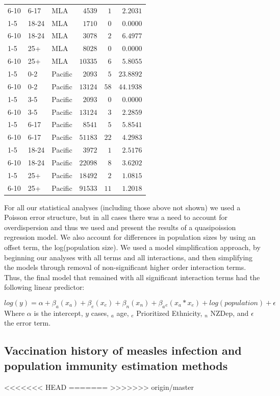 \documentclass{article}
\begin{document}
\begin{itemize}
\begin{table}[hbtp]
\begin{center}
\begin{tabular}{lllrrr}
6-10&6-17&MLA&$   4539$&$  1$&$ 2.2031$\tabularnewline
1-5&18-24&MLA&$   1710$&$  0$&$ 0.0000$\tabularnewline
6-10&18-24&MLA&$   3078$&$  2$&$ 6.4977$\tabularnewline
1-5&25+&MLA&$   8028$&$  0$&$ 0.0000$\tabularnewline
6-10&25+&MLA&$  10335$&$  6$&$ 5.8055$\tabularnewline
1-5&0-2&Pacific&$   2093$&$  5$&$23.8892$\tabularnewline
6-10&0-2&Pacific&$  13124$&$ 58$&$44.1938$\tabularnewline
1-5&3-5&Pacific&$   2093$&$  0$&$ 0.0000$\tabularnewline
6-10&3-5&Pacific&$  13124$&$  3$&$ 2.2859$\tabularnewline
1-5&6-17&Pacific&$   8541$&$  5$&$ 5.8541$\tabularnewline
6-10&6-17&Pacific&$  51183$&$ 22$&$ 4.2983$\tabularnewline
1-5&18-24&Pacific&$   3972$&$  1$&$ 2.5176$\tabularnewline
6-10&18-24&Pacific&$  22098$&$  8$&$ 3.6202$\tabularnewline
1-5&25+&Pacific&$  18492$&$  2$&$ 1.0815$\tabularnewline
6-10&25+&Pacific&$  91533$&$ 11$&$ 1.2018$\tabularnewline
\hline
\end{tabular}\end{center}\label{table:percap}
\end{table}

For all our statistical analyses (including those above not shown) we used a Poisson error structure, but in all cases there was a need to account for overdispersion and thus we used and present the results of a quasipoission regression model. We also account for differences in population sizes by using an offset term, the log(population size). We used a model simplification approach, by beginning our analyses with all terms and all interactions, and then simplifying the models through removal of non-significant higher order interaction terms. Thus, the final model that remained with all significant interaction terms had the following linear predictor:

\begin{equation} \label{eq:reg}
 log(y) = \alpha + \beta _a (x_a)+ \beta _e(x_e)+ \beta _n (x_n) + \beta _a{}_e(x_a * x_e)+ log(population)  + \epsilon
  \end{equation}
Where $\alpha$ is the intercept, $y$ cases, $_a$ age, $_e$ Prioritized Ethnicity, $_n$ NZDep, and $\epsilon$ the error term.



\subsection{Vaccination history of measles infection and population immunity estimation methods}
<<<<<<< HEAD
\label{sub:immunestat}
=======
>>>>>>> origin/master


\end{itemize}
\end{document}

